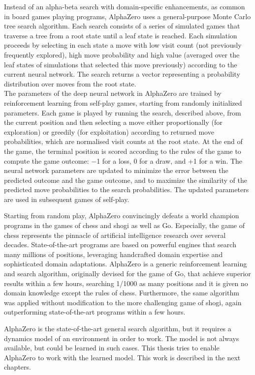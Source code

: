 Instead of an alpha-beta search with domain-specific enhancements, as common in board games playing programs, AlphaZero uses a general-purpose Monte Carlo tree search \cite{Algo.MCTS} algorithm. Each search consists of a series of simulated games that traverse a tree from a root state until a leaf state is reached. Each simulation proceeds by selecting in each state a move with low visit count (not previously frequently explored), high move probability and high value (averaged over the leaf states of simulations that selected this move previously) according to the current neural network. The search returns a vector representing a probability distribution over moves from the root state. \\
The parameters of the deep neural network in AlphaZero are trained by reinforcement learning from self-play games, starting from randomly initialized parameters. Each game is played by running the search, described above, from the current position and then selecting a move either proportionally (for exploration) or greedily (for exploitation) according to returned move probabilities, which are normalised visit counts at the root state. At the end of the game, the terminal position is scored according to the rules of the game to compute the game outcome: −1 for a loss, 0 for a draw, and +1 for a win. The neural network parameters are updated to minimize the error between the predicted outcome and the game outcome, and to maximize the similarity of the predicted move probabilities to the search probabilities. The updated parameters are used in subsequent games of self-play.

Starting from random play, AlphaZero convincingly defeats a world champion programs in the games of chess and shogi as well as Go. Especially, the game of chess represents the pinnacle of artificial intelligence research over several decades. State-of-the-art programs are based on powerful engines that search many millions of positions, leveraging handcrafted domain expertise and sophisticated domain adaptations. AlphaZero is a generic reinforcement learning and search algorithm, originally devised for the game of Go, that achieve superior results within a few hours, searching 1/1000 as many positions and it is given no domain knowledge except the rules of chess. Furthermore, the same algorithm was applied without modification to the more challenging game of shogi, again outperforming state-of-the-art programs within a few hours.

AlphaZero is the state-of-the-art general search algorithm, but it requires a dynamics model of an environment in order to work. The model is not always available, but could be learned in such cases. This thesis tries to enable AlphaZero to work with the learned model. This work is described in the next chapters.

